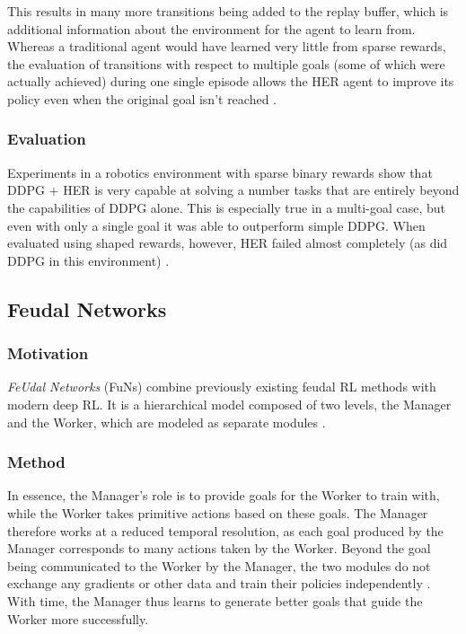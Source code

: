 \documentclass[runningheads]{llncs}
\begin{document}
This results in many more transitions being added to the replay buffer, which is additional information about the environment for the agent to learn from. Whereas a traditional agent would have learned very little from sparse rewards, the evaluation of transitions with respect to multiple goals (some of which were actually achieved) during one single episode allows the HER agent to improve its policy even when the original goal isn't reached \cite{andrychowicz2017hindsight}.

\subsubsection{Evaluation}

Experiments in a robotics environment with sparse binary rewards show that DDPG + HER is very capable at solving a number tasks that are entirely beyond the capabilities of DDPG alone. This is especially true in a multi-goal case, but even with only a single goal it was able to outperform simple DDPG. When evaluated using shaped rewards, however, HER failed almost completely (as did DDPG in this environment) \cite{andrychowicz2017hindsight}.

\subsection{Feudal Networks}

\subsubsection{Motivation}

\textit{FeUdal Networks} (FuNs) combine previously existing feudal RL methods \cite{dayan1993feudal} with modern deep RL. It is a hierarchical model composed of two levels, the Manager and the Worker, which are modeled as separate modules \cite{vezhnevets2017feudal}.

\subsubsection{Method}

In essence, the Manager's role is to provide goals for the Worker to train with, while the Worker takes primitive actions based on these goals. The Manager therefore works at a reduced temporal resolution, as each goal produced by the Manager corresponds to many actions taken by the Worker. Beyond the goal being communicated to the Worker by the Manager, the two modules do not exchange any gradients or other data and train their policies independently \cite{vezhnevets2017feudal}. With time, the Manager thus learns to generate better goals that guide the Worker more successfully.
\end{document}
